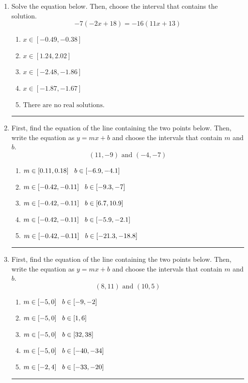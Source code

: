\documentclass[14pt]{extbook}
\newcommand{\litem}[1]{\item#1\hspace*{-1cm}\rule{\textwidth}{0.4pt}}
\begin{document}
\begin{enumerate}
{\begin{enumerate}[label=\Alph*.]
\end{enumerate} }
\litem{
Solve the equation below. Then, choose the interval that contains the solution.\[ -7(-2x + 18) = -16(11x + 13) \]\begin{enumerate}[label=\Alph*.]
\item \( x \in [-0.49, -0.38] \)
\item \( x \in [1.24, 2.02] \)
\item \( x \in [-2.48, -1.86] \)
\item \( x \in [-1.87, -1.67] \)
\item \( \text{There are no real solutions.} \)

\end{enumerate} }
\litem{
First, find the equation of the line containing the two points below. Then, write the equation as $ y=mx+b $ and choose the intervals that contain $m$ and $b$.\[ (11, -9) \text{ and } (-4, -7) \]\begin{enumerate}[label=\Alph*.]
\item \( m \in [0.11, 0.18] \hspace*{3mm} b \in [-6.9, -4.1] \)
\item \( m \in [-0.42, -0.11] \hspace*{3mm} b \in [-9.3, -7] \)
\item \( m \in [-0.42, -0.11] \hspace*{3mm} b \in [6.7, 10.9] \)
\item \( m \in [-0.42, -0.11] \hspace*{3mm} b \in [-5.9, -2.1] \)
\item \( m \in [-0.42, -0.11] \hspace*{3mm} b \in [-21.3, -18.8] \)

\end{enumerate} }
\litem{
First, find the equation of the line containing the two points below. Then, write the equation as $ y=mx+b $ and choose the intervals that contain $m$ and $b$.\[ (8, 11) \text{ and } (10, 5) \]\begin{enumerate}[label=\Alph*.]
\item \( m \in [-5, 0] \hspace*{3mm} b \in [-9, -2] \)
\item \( m \in [-5, 0] \hspace*{3mm} b \in [1, 6] \)
\item \( m \in [-5, 0] \hspace*{3mm} b \in [32, 38] \)
\item \( m \in [-5, 0] \hspace*{3mm} b \in [-40, -34] \)
\item \( m \in [-2, 4] \hspace*{3mm} b \in [-33, -20] \)


\end{enumerate}}
\end{enumerate}
\end{document}
